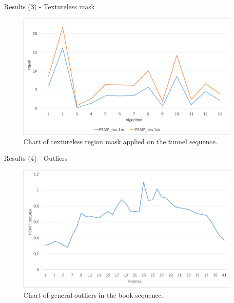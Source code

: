 \documentclass[10pt]{beamer}
\begin{document}
\begin{frame}[fragile]{Results (3) - Textureless mask}
  \begin{figure}[h!]
  \centering
  \includegraphics[width=1.0\textwidth]{../paper/src/images/evaluation/plots/05-tunnel-pbmp-tex-1.pdf}
  \caption{Chart of textureless region mask applied on the tunnel sequence.}
  \end{figure}
\end{frame}

\begin{frame}[fragile]{Results (4) - Outliers}
  \begin{figure}[h!]
  \centering
  \includegraphics[width=1.0\textwidth]{../paper/src/images/evaluation/plots/01-book-general-outliers.pdf}
  \caption{Chart of general outliers in the book sequence.}
  \end{figure}
\end{frame}
\end{document}
